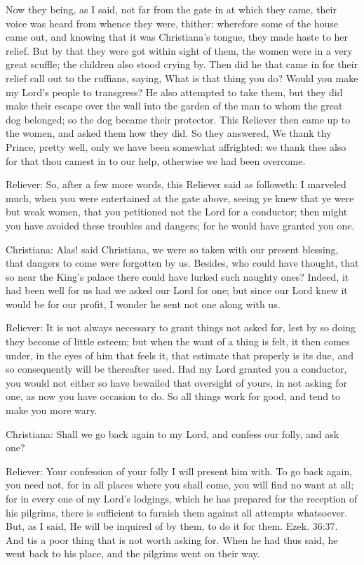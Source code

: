Now they being, as I said, not far from the gate in at which they came, their voice was heard from whence they were, thither: wherefore some of the house came out, and knowing that it was Christiana's tongue, they made haste to her relief. But by that they were got within sight of them, the women were in a very great scuffle; the children also stood crying by. Then did he that came in for their relief call out to the ruffians, saying, What is that thing you do? Would you make my Lord's people to transgress? He also attempted to take them, but they did make their escape over the wall into the garden of the man to whom the great dog belonged; so the dog became their protector. This Reliever then came up to the women, and asked them how they did. So they answered, We thank thy Prince, pretty well, only we have been somewhat affrighted: we thank thee also for that thou camest in to our help, otherwise we had been overcome.

Reliever: So, after a few more words, this Reliever said as followeth: I marveled much, when you were entertained at the gate above, seeing ye knew that ye were but weak women, that you petitioned not the Lord for a conductor; then might you have avoided these troubles and dangers; for he would have granted you one.

Christiana: Alas! said Christiana, we were so taken with our present blessing, that dangers to come were forgotten by us. Besides, who could have thought, that so near the King's palace there could have lurked such naughty ones? Indeed, it had been well for us had we asked our Lord for one; but since our Lord knew it would be for our profit, I wonder he sent not one along with us.

Reliever: It is not always necessary to grant things not asked for, lest by so doing they become of little esteem; but when the want of a thing is felt, it then comes under, in the eyes of him that feels it, that estimate that properly is its due, and so consequently will be thereafter used. Had my Lord granted you a conductor, you would not either so have bewailed that oversight of yours, in not asking for one, as now you have occasion to do. So all things work for good, and tend to make you more wary.

Christiana: Shall we go back again to my Lord, and confess our folly, and ask one?

Reliever: Your confession of your folly I will present him with. To go back again, you need not, for in all places where you shall come, you will find no want at all; for in every one of my Lord's lodgings, which he has prepared for the reception of his pilgrims, there is sufficient to furnish them against all attempts whatsoever. But, as I said, He will be inquired of by them, to do it for them. Ezek. 36:37. And tis a poor thing that is not worth asking for. When he had thus said, he went back to his place, and the pilgrims went on their way.

